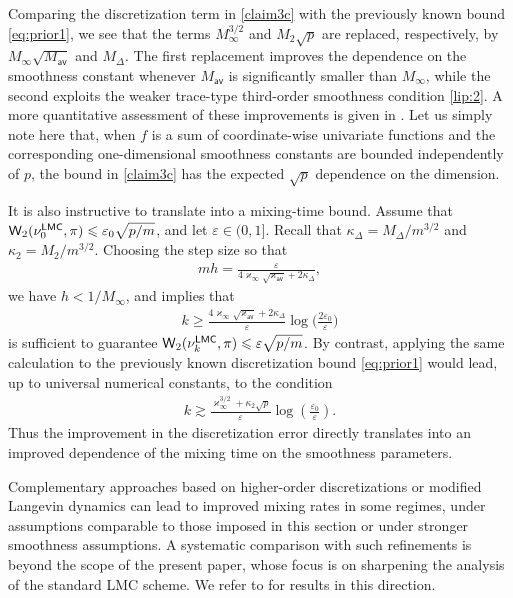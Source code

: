 \documentclass[aos,reqno]{imsart}
\def\wass{\mathsf{W}}
\def\kappav{\varkappa_{\textsf{av}}}
\def\kappamax{\varkappa_{\infty}}
\def\Mav{M_{\textsf{av}}}
\def\Mmax{M_{\infty}}
\theoremstyle{definition}
\begin{document}
Comparing the discretization term in \eqref{claim3c} with
the previously known bound \eqref{eq:prior1}, we see that
the terms $\Mmax^{3/2}$ and $M_2\sqrt p$ are replaced,
respectively, by $\Mmax\sqrt{\Mav}$ and $M_\Delta$. The
first replacement improves the dependence on the smoothness
constant whenever $\Mav$ is significantly smaller than
$\Mmax$, while the second exploits the weaker trace-type
third-order smoothness condition \eqref{lip:2}. A more
quantitative assessment of these improvements is given in
. Let us simply note here that, when $f$ is
a sum of coordinate-wise univariate functions and the
corresponding one-dimensional smoothness constants are
bounded independently of $p$, the bound in \eqref{claim3c}
has the expected $\sqrt p$ dependence on the dimension.

It is also instructive to translate  into a
mixing-time bound. Assume that $\wass_2(\nu_0^{\sf LMC}, 
\pi) \leqslant \varepsilon_0\sqrt{{p}/{m}}$, and let
$\varepsilon\in(0,1]$. Recall that $\kappa_\Delta = 
M_\Delta/m^{3/2}$ and $\kappa_2 = M_2/m^{3/2}$. 
Choosing the step size so that
\begin{align}
    mh =
    \frac{\varepsilon}{4\kappamax\sqrt{\kappav}
    +2\kappa_\Delta},
\end{align}
we have $h<1/\Mmax$, and  implies that
\begin{align}
    k \geqslant
    \frac{4\kappamax\sqrt{\kappav}
    +2\kappa_\Delta}{\varepsilon}
    \log\Big(\frac{2\varepsilon_0}{\varepsilon}\Big)
\end{align}
is sufficient to guarantee
$\wass_2(\nu_k^{\sf LMC},\pi)
\leqslant\varepsilon\sqrt{{p}/{m}}$. By contrast, 
applying the same calculation to the previously known
discretization bound \eqref{eq:prior1} would lead, up 
to universal numerical constants, to the condition
\begin{align}
    k
    \gtrsim
    \frac{\kappamax^{3/2}+\kappa_2\sqrt p}{\varepsilon}
    \log\left(\frac{\varepsilon_0}{\varepsilon}\right).
\end{align}
Thus the improvement in the discretization error directly
translates into an improved dependence of the mixing time
on the smoothness parameters.

Complementary approaches based on higher-order
discretizations or modified Langevin dynamics can lead to
improved mixing rates in some regimes, under assumptions
comparable to those imposed in this section or under 
stronger smoothness assumptions. A systematic
comparison with such refinements is beyond the scope of the
present paper, whose focus is on sharpening the analysis of
the standard LMC scheme. We refer to \cite{cheng2018a,
dalalyan2019user,dalalyan_riou_2018,Mou21} for results in
this direction.
\end{document}
